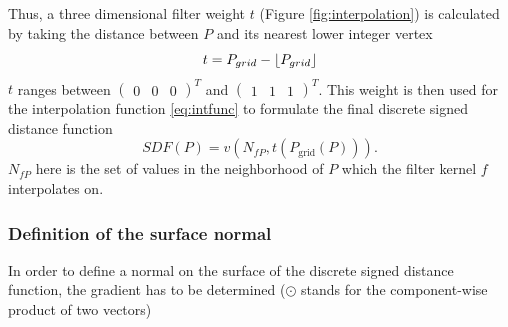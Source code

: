 \documentclass[12pt]{article}
\DeclarePairedDelimiter\floor{\lfloor}{\rfloor}
\begin{document}
Thus, a three dimensional filter weight $t$ (Figure \ref{fig:interpolation}) is calculated by taking the distance between $P$ and its nearest lower integer vertex
\begin{equation} \label{eq:weightt}
t = P_{grid} - \floor{P_{grid}}
\end{equation}
$t$ ranges between $\begin{pmatrix} 0 & 0 & 0 \end{pmatrix}^T$ and $\begin{pmatrix} 1 & 1 & 1 \end{pmatrix}^T$. This weight is then used for the interpolation function \eqref{eq:intfunc} to formulate the final discrete signed distance function
\begin{equation} \label{eq:discretesdf}
SDF(P) = v \left(N_{fP}, t \left(P_{\text{grid}}\left(P \right) \right) \right).
\end{equation}
$N_{fP}$ here is the set of values in the neighborhood of $P$ which the filter kernel $f$ interpolates on.

\subsubsection{Definition of the surface normal}
In order to define a normal on the surface of the discrete signed distance function, the gradient has to be determined ($\odot$ stands for the component-wise product of two vectors)
\end{document}
